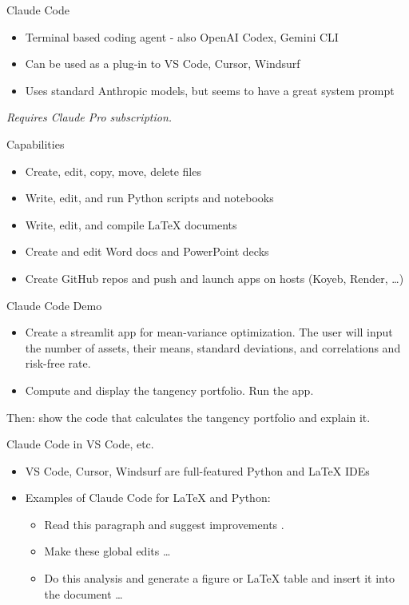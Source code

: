 \documentclass[
  ignorenonframetext,
]{beamer}
\providecommand{\tightlist}{%
  \setlength{\itemsep}{0pt}\setlength{\parskip}{0pt}}\usepackage{longtable,booktabs,array}
\begin{document}
\begin{frame}{Claude Code}
\label{claude-code}
\begin{itemize}
\tightlist
\item
  Terminal based coding agent - also OpenAI Codex, Gemini CLI
\item
  Can be used as a plug-in to VS Code, Cursor, Windsurf
\item
  Uses standard Anthropic models, but seems to have a great system
  prompt
\end{itemize}

\emph{Requires Claude Pro subscription.}
\end{frame}

\begin{frame}{Capabilities}
\label{capabilities}
\begin{itemize}
\tightlist
\item
  Create, edit, copy, move, delete files
\item
  Write, edit, and run Python scripts and notebooks
\item
  Write, edit, and compile LaTeX documents
\item
  Create and edit Word docs and PowerPoint decks
\item
  Create GitHub repos and push and launch apps on hosts (Koyeb, Render,
  \ldots)
\end{itemize}
\end{frame}

\begin{frame}{Claude Code Demo}
\label{claude-code-demo}
\begin{itemize}
\tightlist
\item
  Create a streamlit app for mean-variance optimization. The user will
  input the number of assets, their means, standard deviations, and
  correlations and risk-free rate.
\item
  Compute and display the tangency portfolio. Run the app.
\end{itemize}

Then: show the code that calculates the tangency portfolio and explain
it.
\end{frame}

\begin{frame}{Claude Code in VS Code, etc.}
\label{claude-code-in-vs-code-etc.}
\begin{itemize}
\tightlist
\item
  VS Code, Cursor, Windsurf are full-featured Python and LaTeX IDEs
\item
  Examples of Claude Code for LaTeX and Python:

  \begin{itemize}
  \tightlist
  \item
    Read this paragraph and suggest improvements .
  \item
    Make these global edits \ldots{}
  \item
    Do this analysis and generate a figure or LaTeX table and insert it
    into the document \ldots{}
  \end{itemize}
\end{itemize}
\end{frame}
\end{document}
